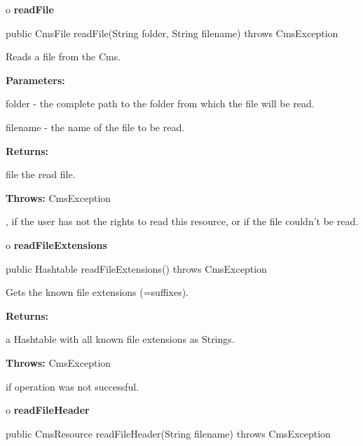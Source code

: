 o {\bf readFile}

\begin{PRE}
 public CmsFile readFile(String folder,
                         String filename) throws CmsException
\end{PRE}

\begin{description}
\htmlDD Reads a file from the Cms.

\begin{description}
\item {\bf Parameters:}

folder - the complete path to the folder from which the file will be read.

filename - the name of the file to be read.
\item {\bf Returns:}

file the read file.
\item {\bf Throws:} CmsException

, if the user has not the rights to read this resource, or if the file
couldn't be read.
\end{description}

\end{description}

o {\bf readFileExtensions}

\begin{PRE}
 public Hashtable readFileExtensions() throws CmsException
\end{PRE}

\begin{description}
\htmlDD Gets the known file extensions (=suffixes).

\begin{description}
\item {\bf Returns:}

a Hashtable with all known file extensions as Strings.
\item {\bf Throws:} CmsException

if operation was not successful.
\end{description}

\end{description}

o {\bf readFileHeader}

\begin{PRE}
 public CmsResource readFileHeader(String filename) throws CmsException
\end{PRE}


